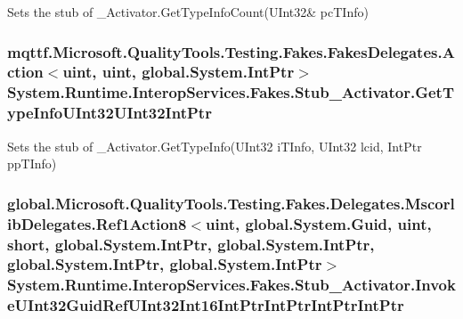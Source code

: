Sets the stub of \-\_\-\-Activator.\-Get\-Type\-Info\-Count(U\-Int32\& pc\-T\-Info)

\hypertarget{class_system_1_1_runtime_1_1_interop_services_1_1_fakes_1_1_stub___activator_a4ed21a0536bbbda1b6e984c9da1380a1}{
\subsubsection[{Get\-Type\-Info\-U\-Int32\-U\-Int32\-Int\-Ptr}]{\setlength{\rightskip}{0pt plus 5cm}mqttf.\-Microsoft.\-Quality\-Tools.\-Testing.\-Fakes.\-Fakes\-Delegates.\-Action$<$uint, uint, global.\-System.\-Int\-Ptr$>$ System.\-Runtime.\-Interop\-Services.\-Fakes.\-Stub\-\_\-\-Activator.\-Get\-Type\-Info\-U\-Int32\-U\-Int32\-Int\-Ptr}}\label{class_system_1_1_runtime_1_1_interop_services_1_1_fakes_1_1_stub___activator_a4ed21a0536bbbda1b6e984c9da1380a1}


Sets the stub of \-\_\-\-Activator.\-Get\-Type\-Info(\-U\-Int32 i\-T\-Info, U\-Int32 lcid, Int\-Ptr pp\-T\-Info)

\hypertarget{class_system_1_1_runtime_1_1_interop_services_1_1_fakes_1_1_stub___activator_a6c098ac066eda0771e259a3e2b3b66d7}{
\subsubsection[{Invoke\-U\-Int32\-Guid\-Ref\-U\-Int32\-Int16\-Int\-Ptr\-Int\-Ptr\-Int\-Ptr\-Int\-Ptr}]{\setlength{\rightskip}{0pt plus 5cm}global.\-Microsoft.\-Quality\-Tools.\-Testing.\-Fakes.\-Delegates.\-Mscorlib\-Delegates.\-Ref1\-Action8$<$uint, global.\-System.\-Guid, uint, short, global.\-System.\-Int\-Ptr, global.\-System.\-Int\-Ptr, global.\-System.\-Int\-Ptr, global.\-System.\-Int\-Ptr$>$ System.\-Runtime.\-Interop\-Services.\-Fakes.\-Stub\-\_\-\-Activator.\-Invoke\-U\-Int32\-Guid\-Ref\-U\-Int32\-Int16\-Int\-Ptr\-Int\-Ptr\-Int\-Ptr\-Int\-Ptr}}\label{class_system_1_1_runtime_1_1_interop_services_1_1_fakes_1_1_stub___activator_a6c098ac066eda0771e259a3e2b3b66d7}


